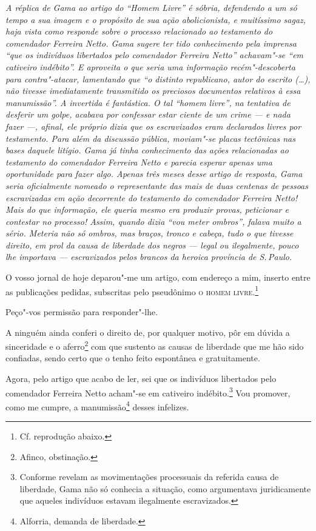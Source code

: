 \begin{flushleft}
{\footnotesize\itshape
A réplica de Gama ao artigo do ``Homem Livre'' é sóbria, defendendo
a um só tempo a sua imagem e o propósito de sua ação abolicionista, e
muitíssimo sagaz, haja vista como responde sobre o processo relacionado
ao testamento do comendador Ferreira Netto. Gama sugere ter tido
conhecimento pela imprensa ``que os indivíduos libertados pelo comendador
Ferreira Netto'' achavam"-se ``em cativeiro indébito''. E aproveita o que
seria uma informação recém"-descoberta para contra"-atacar, lamentando que
``o distinto republicano, autor do escrito (\ldots{}), não tivesse
imediatamente transmitido os preciosos documentos relativos à essa
manumissão''. A invertida é fantástica. O tal ``homem livre'', na tentativa
de desferir um golpe, acabava por confessar estar ciente de um crime ---
e nada fazer ---, afinal, ele próprio dizia que os escravizados eram
declarados livres por testamento. Para além da discussão pública,
moviam"-se placas tectônicas nas bases daquele litígio. Gama já tinha
conhecimento das ações relacionadas ao testamento do comendador Ferreira
Netto e parecia esperar apenas uma oportunidade para fazer algo. Apenas
três meses desse artigo de resposta, Gama seria oficialmente nomeado o
representante das mais de duas centenas de pessoas escravizadas em ação
decorrente do testamento do comendador Ferreira Netto! Mais do que
informação, ele queria mesmo era produzir provas, peticionar e
contestar no processo! Assim, quando dizia ``vou meter ombros'', falava
muito a sério. Meteria não só ombros, mas braços, tronco e cabeça, tudo
o que tivesse direito, em prol da causa de liberdade dos negros --- legal
ou ilegalmente, pouco lhe importava --- escravizados pelos brancos da
heroica província de S.\,Paulo. }
\end{flushleft}

\noindent{}O vosso jornal de hoje deparou"-me um artigo, com endereço a mim, inserto
entre as publicações pedidas, subscritas pelo pseudônimo \textsc{o homem
livre}.\footnote{Cf. reprodução abaixo.}

Peço"-vos permissão para responder"-lhe.

A ninguém ainda conferi o direito de, por qualquer motivo, pôr em dúvida
a sinceridade e o aferro\footnote{Afinco, obstinação.} com que
sustento as causas de liberdade que me hão sido confiadas, sendo certo
que o tenho feito espontânea e gratuitamente.

Agora, pelo artigo que acabo de ler, sei que os indivíduos libertados
pelo comendador Ferreira Netto acham"-se em cativeiro indébito.\footnote{Conforme revelam as movimentações processuais da referida causa de
  liberdade, Gama não só conhecia a situação, como argumentava
  juridicamente que aqueles indivíduos estavam ilegalmente escravizados.}
Vou promover, como me cumpre, a manumissão\footnote{Alforria, demanda
  de liberdade.} desses infelizes.

